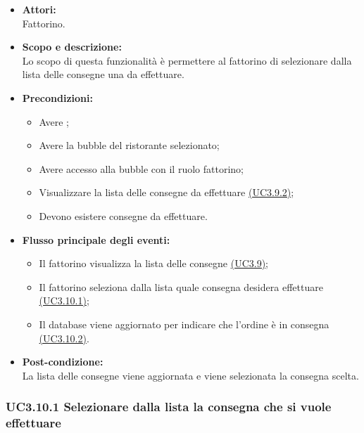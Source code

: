 \begin{itemize}
	\item \textbf{Attori:}
	\\Fattorino.
	\item \textbf{Scopo e descrizione:} 
	\\Lo scopo di questa funzionalità è permettere al fattorino di selezionare dalla lista delle consegne una da effettuare.
	\item \textbf{Precondizioni:}
	\begin{itemize}
		\item Avere ;
		\item Avere la bubble del ristorante selezionato;
		\item Avere accesso alla bubble con il ruolo fattorino;
		\item Visualizzare la lista delle consegne da effettuare \hyperref[UC3.9.2]{(UC3.9.2)};
		\item Devono esistere consegne da effettuare.
	\end{itemize}
	\item \textbf{Flusso principale degli eventi:}
	\begin{itemize}
		\item Il fattorino visualizza la lista delle consegne \hyperref[UC3.9]{(UC3.9)};
		\item Il fattorino seleziona dalla lista quale consegna desidera effettuare \hyperref[UC3.10.1]{(UC3.10.1)};
		\item Il database viene aggiornato per indicare che l’ordine è in consegna \hyperref[UC3.10.2]{(UC3.10.2)}.
	\end{itemize}
	\item \textbf{Post-condizione:}
	\\La lista delle consegne viene aggiornata e viene selezionata la consegna scelta.
\end{itemize}

\subsubsection{UC3.10.1 Selezionare dalla lista la consegna che si vuole effettuare} \label{UC3.10.1}


